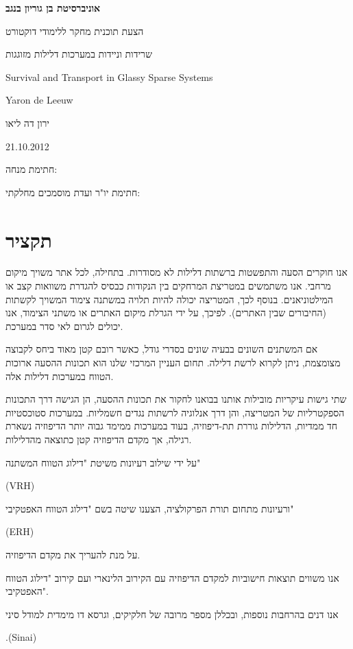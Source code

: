 \documentclass[onecolumn,fleqn,12pt,openany,a4paper,longbibliography,oneside]{book}
\begin{document}
{\setlength{\parindent}{0cm}
\begin{center}

{\Huge\bfseries
אוניברסיטת בן גוריון בנגב


הצעת תוכנית מחקר ללימודי דוקטורט
\vspace{6em}



שרידות וניידות במערכות דלילות מזוגגות




\begin{english}

Survival and Transport in Glassy Sparse Systems

\vspace{2em}

Yaron de Leeuw
\end{english}

ירון דה ליאו


21.10.2012

}%
\end{center}
\vspace{8em}

חתימת מנחה: 
\underline{\hspace{20ex}}


חתימת יו"ר ועדת מוסמכים מחלקתי:
\underline{\hspace{20ex}}
}%
\newpage
\section*{תקציר}
אנו חוקרים הסעה והתפשטות ברשתות דלילות לא מסודרות. בתחילה, לכל אתר משויך מיקום מרחבי. 
אנו משתמשים במטריצת המרחקים בין הנקודות כבסיס להגדרת משוואות קצב או המילטוניאנים.
בנוסף לכך, המטריצה יכולה להיות תלויה במשתנה צימוד המשויך לקשתות (החיבורים שבין האתרים).
לפיכך, על ידי הגרלת מיקום האתרים או משתני הצימוד, אנו יכולים לגרום לאי סדר במערכת.


אם המשתנים השונים בבעיה שונים בסדרי גודל, כאשר רובם קטן מאוד ביחס לקבוצה מצומצמת, 
ניתן לקרוא לרשת דלילה. תחום העניין המרכזי שלנו הוא תכונות ההסעה ארוכות הטווח במערכות דלילות אלה.


שתי גישות עיקריות מובילות אותנו בבואנו לחקור את תכונות ההסעה, הן הגישה דרך התכונות הספקטרליות 
של המטריצה, והן דרך אנלוגיה לרשתות נגדים חשמליות. במערכות סטוכסטיות חד ממדיות, 
הדלילות גוררת תת-דיפוזיה, בעוד במערכות ממימד גבוה יותר הדיפוזיה נשארת רגילה, 
אך מקדם הדיפוזיה קטן כתוצאה מהדלילות.


על ידי שילוב רעיונות משיטת "דילוג הטווח המשתנה" 
\begin{english}
(VRH)
\end{english}
ורעיונות מתחום תורת הפרקולציה,
הצענו שיטה בשם "דילוג הטווח האפטקיבי"
\begin{english}
(ERH)
\end{english}
 על מנת להעריך את מקדם הדיפוזיה.


אנו משווים תוצאות חישוביות למקדם הדיפוזיה עם הקירוב הלינארי ועם קירוב "דילוג הטווח האפטקיבי".


אנו דנים בהרחבות נוספות, ובכללן מספר מרובה של חלקיקים, וגרסא דו מימדית למודל סיני
\begin{english}
.(Sinai)
\end{english}
\end{document}
